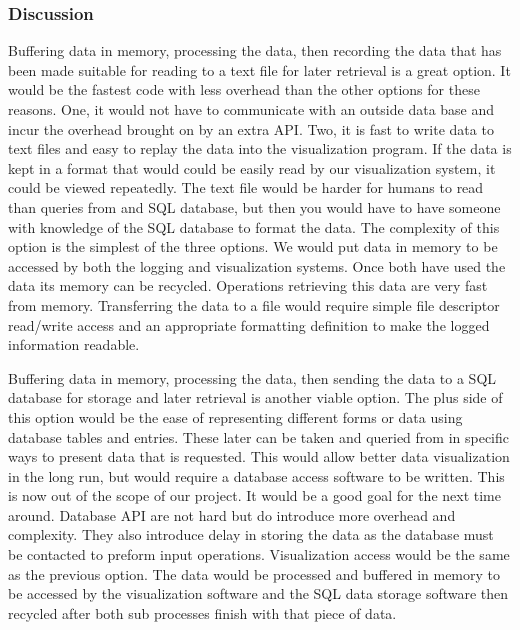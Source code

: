 \documentclass[10pt,draftclsnofoot,onecolumn]{IEEEtran}
\begin{document}
\subsubsection{Discussion}
      Buffering data in memory, processing the data, then recording the data that has been made suitable for reading to a text file for later retrieval is a great option. It would be the fastest code with less overhead than the other options for these reasons. One, it would not have to communicate with an outside data base and incur the overhead brought on by an extra API.  Two, it is fast to write data to text files and easy to replay the data into the visualization program. If the data is kept in a format that would could be easily read by our visualization system, it could be viewed repeatedly. The text file would be harder for humans to read than queries from and SQL database, but then you would have to have someone with knowledge of the SQL database to format the data. The complexity of this option is the simplest of the three options. We would put data in memory to be accessed by both the logging and visualization systems. Once both have used the data its memory can be recycled. Operations retrieving this data are very fast from memory. Transferring the data to a file would require simple file descriptor read/write access and an appropriate formatting definition to make the logged information readable.\par
     Buffering data in memory, processing the data, then sending the data to a SQL database for storage and later retrieval is another viable option. The plus side of this option would be the ease of representing different forms or data using database tables and entries. These later can be taken and queried from in specific ways to present data that is requested. This would allow better data visualization in the long run, but would require a database access software to be written. This is now out of the scope of our project. It would be a good goal for the next time around. Database API are not hard but do introduce more overhead and complexity. They also introduce delay in storing the data as the database must be contacted to preform input operations. Visualization access would be the same as the previous option. The data would be processed and buffered in memory to be accessed by the visualization software and the SQL data storage software then recycled after both sub processes finish with that piece of data.\par
\end{document}
